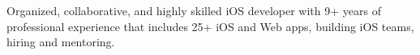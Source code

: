 

\begin{cventries}

Organized, collaborative, and highly skilled iOS developer with 9+ years of professional experience that includes 25+ iOS and Web apps, building iOS teams, hiring and mentoring.

\end{cventries}